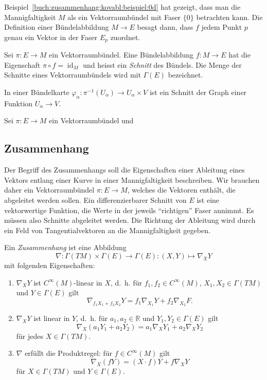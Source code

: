 \begin{beispiel}
Beispiel~\ref{buch:zusammenhang:kovabl:beispiel:0d} hat gezeigt, dass
man die Mannigfaltigkeit $M$ als ein Vektorraumbündel mit Faser $\{0\}$
betrachten kann.
Die Definition einer Bündelabbildung $M\to E$ besagt dann, dass 
$f$ jedem Punkt $p$ genau ein Vektor in der Faser $E_p$ zuordnet.
\end{beispiel}

\begin{definition}
Sei $\pi\colon E\to M$ ein Vektorraumbündel.
Eine Bündelabbildung $f\colon M\to E$ hat die Eigenschaft
$\pi\circ f=\operatorname{id}_M$ und heisst ein \emph{Schnitt}
des Bündels.
Die Menge der Schnitte eines Vektorraumbündels wird mit $\Gamma(E)$
bezeichnet.
\end{definition}

In einer Bündelkarte $\varphi_\alpha:\pi^{-1}(U_\alpha) \to U_\alpha\times V$
ist ein Schnitt der Graph einer Funktion $U_\alpha\to V$.

\begin{beispiel}
Sei $\pi\colon E\to M$ ein Vektorraumbündel und 
\end{beispiel}

\subsection{Zusammenhang}
Der Begriff des Zusammenhangs soll die Eigenschaften einer Ableitung 
eines Vektors entlang einer Kurve in einer Mannigfaltigkeit beschreiben.
Wir brauchen daher ein Vektorraumbündel $\pi\colon E\to M$, welches
die Vektoren enthält, die abgeleitet werden sollen.
Ein differenzierbarer Schnitt von $E$ ist eine vektorwertige
Funktion, die Werte in der jeweils ``richtigen'' Faser annimmt.
Es müssen also Schnitte abgeleitet werden.
Die Richtung der Ableitung wird durch ein Feld von Tangentialvektoren
an die Mannigfaltigkeit gegeben.

\begin{definition}
Ein \emph{Zusammenhang} ist eine Abbildung
%
\[
\nabla 
\colon
\Gamma(TM)\times \Gamma(E) \to \Gamma(E)
:
(X,Y) \mapsto \nabla_X Y
\]
mit folgenden Eigenschaften:
\begin{enumerate}
\item $\nabla_X Y$ ist $C^\infty(M)$-linear in $X$, d.~h. für 
$f_1,f_2\in C^{\infty}(M)$, $X_1,X_2\in \Gamma(TM)$ und $Y\in\Gamma(E)$ gilt
\[
\nabla_{f_1X_1+f_2X_2}Y
=
f_1\nabla_{X_1}Y + f_2\nabla_{X_2}F.
\]
\item $\nabla_X Y$ ist linear in $Y$, d.~h. für $a_1,a_2\in\mathbb{R}$
und $Y_1,Y_2\in \Gamma(E)$ gilt
\[
\nabla_X(a_1Y_1+a_2Y_2)
=
a_1\nabla_XY_1
+
a_2\nabla_XY_2
\]
für jedes $X\in\Gamma(TM)$.
\item
$\nabla$ erfüllt die Produktregel: für $f\in C^\infty(M)$ gilt
%
\[
\nabla_X (fY)
=
(X\cdot f)Y + f\nabla_X Y
\]
für $X\in\Gamma(TM)$ und $Y\in\Gamma(E)$.
\end{enumerate}
\end{definition}

